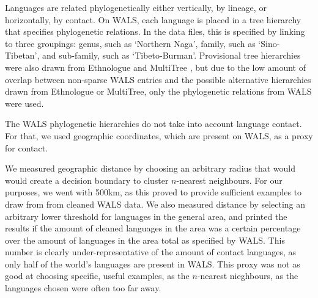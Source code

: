 \documentclass[11pt]{article}
\begin{document}

Languages are related phylogenetically either vertically, by lineage, or horizontally, by contact. On WALS, each language is placed in a tree hierarchy that specifies phylogenetic relations. In the data files, this is specified by linking to three groupings: genus, such as `Northern Naga', family, such as `Sino-Tibetan', and sub-family, such as `Tibeto-Burman'. Provisional tree hierarchies were also drawn from Ethnologue \cite{ethnologue} and MultiTree \cite{multitree}, but due to the low amount of overlap between non-sparse WALS entries and the possible alternative hierarchies drawn from Ethnologue or MultiTree, only the phylogenetic relations from WALS were used.




The WALS phylogenetic hierarchies do not take into account language contact. For that, we used geographic coordinates, which are present on WALS, as a proxy for contact. 

We measured geographic distance by choosing an arbitrary radius that would would create a decision boundary to cluster $n$-nearest neighbours. For our purposes, we went with 500km, as this proved to provide sufficient examples to draw from from cleaned WALS data. We also measured distance by selecting an arbitrary lower threshold for languages in the general area, and printed the results if the amount of cleaned languages in the area was a certain percentage over the amount of languages in the area total as specified by WALS. This number is clearly under-representative of the amount of contact languages, as only half of the world's languages are present in WALS. This proxy was not as good at choosing specific, useful examples, as the $n$-nearest nieghbours, as the languages chosen were often too far away. 
\end{document}
